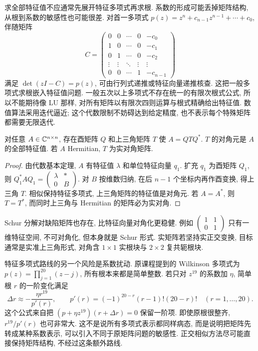 \label{ch:eigen}
求全部特征值不应通常先展开特征多项式再求根. 系数的形成可能丢掉矩阵结构, 从根到系数的敏感性也可能很差. 对首一多项式
$p(z)=z^n+c_{n-1}z^{n-1}+\cdots+c_0$, 伴随矩阵
\[
C=\begin{pmatrix}
0&0&\cdots&0&-c_0\\
1&0&\cdots&0&-c_1\\
0&1&\cdots&0&-c_2\\
\vdots&\vdots&\ddots&\vdots&\vdots\\
0&0&\cdots&1&-c_{n-1}
\end{pmatrix}
\]
满足 $\det(zI-C)=p(z)$, 可由行列式递推或特征向量递推核查. 这把一般多项式求根嵌入特征值问题. 一般五次以上多项式不存在统一的有限次根式公式, 所以不能期待像 LU 那样, 对所有矩阵以有限次四则运算与根式精确给出特征值. 数值算法采用迭代逼近; 这个代数限制不妨碍达到给定精度, 也不表示每个特殊矩阵都需要无限迭代.

\begin{theorem}[复 Schur 分解]\label{thm:schur}
对任意 $A\in\mathbb C^{n\times n}$, 存在酉矩阵 $Q$ 和上三角矩阵 $T$ 使 $A=QTQ^*$. $T$ 的对角元是 $A$ 的全部特征值. 若 $A$ Hermitian, $T$ 为实对角矩阵.
\end{theorem}
\begin{proof}
由代数基本定理, $A$ 有特征值 $\lambda$ 和单位特征向量 $q_1$. 扩充 $q_1$ 为酉矩阵 $Q_1$, 则 $Q_1^*AQ_1=\begin{pmatrix}\lambda&*\\0&B\end{pmatrix}$. 对 $B$ 按维数归纳, 在后 $n-1$ 个坐标内再作酉变换, 得上三角 $T$. 相似保持特征多项式, 上三角矩阵的特征值是对角元. 若 $A=A^*$, 则 $T=T^*$, 而同时上三角与 Hermitian 的矩阵必为实对角.
\end{proof}
Schur 分解对缺陷矩阵也存在, 比特征向量对角化更稳健. 例如 $\begin{pmatrix}1&1\\0&1\end{pmatrix}$ 只有一维特征空间, 不可对角化, 但本身就是 Schur 形式. 实矩阵若坚持实正交变换, 目标通常是实准上三角形式, 对角含 $1\times1$ 实根块与 $2\times2$ 复共轭根块.

特征多项式路线的另一个风险是系数扰动. 原课程提到的 Wilkinson 多项式为 $p(z)=\prod_{j=1}^{20}(z-j)$, 所有根本来都是简单整数. 若只对 $z^{19}$ 的系数加 $\eta$, 简单根 $r$ 的一阶变化满足
\[
\Delta r\approx-\frac{\eta r^{19}}{p'(r)},\qquad
p'(r)=(-1)^{20-r}(r-1)!(20-r)!\quad(r=1,\ldots,20).
\]
这个公式来自把 $(p+\eta z^{19})(r+\Delta r)=0$ 保留一阶项. 即使原根很整齐, $r^{19}/p'(r)$ 也可非常大. 这不是说所有多项式表示都同样病态, 而是说明把矩阵先转成某种系数表示, 可以引入不同于原矩阵问题的敏感性. 正交相似方法尽可能直接保持矩阵结构, 不经过这条额外路线.

